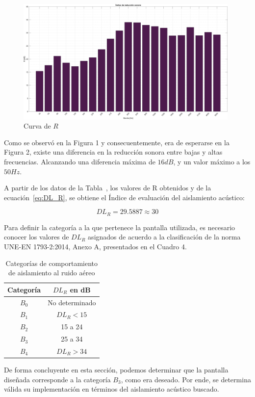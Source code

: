 \begin{figure}[H]
	\centering
	\includegraphics[width=0.98\textwidth]{./img/Indice_reduccion_sonora_bars.png}
	\caption{Curva de $R$}
	\label{fig::indice_reduccion_sonora}
\end{figure}


\par Como se observó en la Figura 1 y consecuentemente, era de esperarse en la Figura 2, existe una diferencia en la reducción sonora entre bajas y altas frecuencias. Alcanzando una diferencia máxima de $16dB$, y un valor máximo a los $50Hz$.

\par A partir de los datos de la Tabla~, los valores de R obtenidos y de la ecuación~\eqref{eq:DL_R}, se obtiene el Índice de evaluación del aislamiento acústico:

\begin{equation*}
    DL_R =   29.5887 \approx 30
\end{equation*}

\par Para definir la categoría a la que pertenece la pantalla utilizada, es necesario conocer los valores de $DL_R$ asignados de acuerdo a la clasificación de la norma UNE-EN 1793-2:2014, Anexo A, presentados en el Cuadro 4. 

\begin{table}[H]
    \centering
    \begin{tabular}{|c|c|} \hline
        \textbf{Categoría} & \textbf{$DL_R$ en dB} \\ \hline \hline
         $B_0$ & No determinado \\ \hline
         $B_1$ & $DL_R < 15$  \\ \hline
         $B_2$ & 15 a 24 \\ \hline
         $B_3$ & 25 a 34 \\ \hline
         $B_4$ & $DL_R > 34$ \\ \hline
    \end{tabular}
    \caption{Categorías de comportamiento de aislamiento al ruido aéreo}
    \label{tab:categorias_aislamiento}
\end{table}


\par De forma concluyente en esta sección, podemos determinar que la pantalla diseñada  corresponde a la categoría $B_3$, como era deseado. Por ende, se determina válida su implementación en términos del aislamiento acústico buscado. 